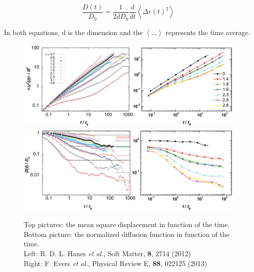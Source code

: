\documentclass[a4paper,12pt]{article}
\newcommand{\etal}{\textit{et al.}}
\begin{document}
\begin{equation}
\frac{D(t)}{D_0}=\frac{1}{2dD_0}\frac{d}{dt}\left< \Delta r(t)^2 \right>
\end{equation}

In both equations, d is the dimension and the $\left< \hdots \right>$ represents the time average.

\begin{figure}[htbp]
\centering
\subfigure
{\includegraphics[width=14cm]{pics/msd_exp.png}}
\subfigure
{\includegraphics[width=14cm]{pics/ndc_exp.png}}
\caption{Top pictures: the mean square displacement in function of the time. Bottom picture: the normalized diffusion function in function of the time.
\\ Left: \small R. D. L. Hanes \etal, Soft Matter, \textbf{8}, 2714 (2012)\\ \normalfont Right: \small F. Evers \etal, Physical Review E, \textbf{88}, 022125 (2013)}
\label{msd ndc exp}
\end{figure}
\end{document}
